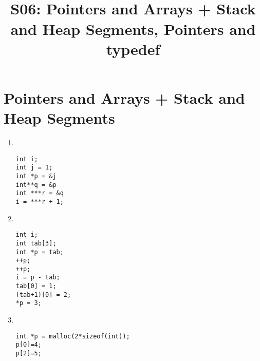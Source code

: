 


\title{
    \unilogo[0.3\textwidth]\\[0.9cm]
    S06: Pointers and Arrays + Stack and Heap Segments, Pointers and typedef
}

\author{\thestudent\theprof}
\lhead{\unilogo}
\rhead{\thestudent\\\theseriesnumber}


% 


\pgfplotsset{compat=newest}

\lstset{
    language=C,
    basicstyle=\footnotesize,
    stepnumber=3,
    firstnumber=1,
}

\raggedbottom %


%
%
\section{Pointers and Arrays + Stack and Heap Segments}


\begin{enumerate}
    \item \
    \begin{lstlisting}
int i;
int j = 1;
int *p = &j
int**q = &p
int ***r = &q
i = ***r + 1;
    \end{lstlisting}

    \item \
    \begin{lstlisting}
int i;
int tab[3];
int *p = tab;
++p;
++p;
i = p - tab;
tab[0] = 1;
(tab+1)[0] = 2;
*p = 3;
    \end{lstlisting}

    \item \
    \begin{lstlisting}
int *p = malloc(2*sizeof(int));
p[0]=4;
p[2]=5;
    \end{lstlisting}
\end{enumerate}



